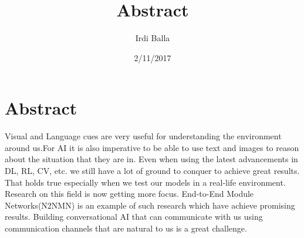 \documentclass{article}
\title{Abstract}
\date{2/11/2017}
\author{Irdi Balla}
\begin{document}
	\maketitle	
	\section{Abstract}
	Visual and Language cues are very useful for understanding the environment around us.For AI it is also imperative to be able to use text and images to reason about the situation that they are in. Even when using the latest advancements in DL, RL, CV, etc. we still have a lot of ground to conquer to achieve great results. That holds true especially when we test our models in a real-life environment. Research on this field is now getting more focus. End-to-End Module Networks(N2NMN) is an example of such research which have achieve promising results. Building conversational AI that can communicate with us using communication channels that are natural to us is a great challenge. 
	
\end{document}
